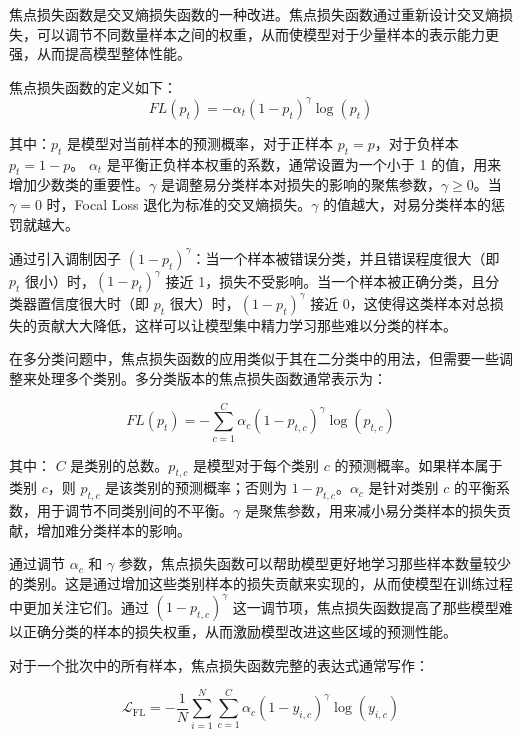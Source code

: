 焦点损失函数是交叉熵损失函数的一种改进。焦点损失函数通过重新设计交叉熵损失，可以调节不同数量样本之间的权重，从而使模型对于少量样本的表示能力更强，从而提高模型整体性能。


焦点损失函数的定义如下：
\begin{equation}
    FL(p_t) = -\alpha_t (1 - p_t)^\gamma \log(p_t)
\end{equation}

其中：\( p_t \) 是模型对当前样本的预测概率，对于正样本 \( p_t = p \)，对于负样本 \( p_t = 1 - p \)。 \( \alpha_t \) 是平衡正负样本权重的系数，通常设置为一个小于 1 的值，用来增加少数类的重要性。\( \gamma \) 是调整易分类样本对损失的影响的聚焦参数，\( \gamma \geq 0 \)。当 \( \gamma = 0 \) 时，Focal Loss 退化为标准的交叉熵损失。\( \gamma \) 的值越大，对易分类样本的惩罚就越大。


通过引入调制因子 \( (1 - p_t)^\gamma \)：当一个样本被错误分类，并且错误程度很大（即 \( p_t \) 很小）时，\( (1 - p_t)^\gamma \) 接近 1，损失不受影响。当一个样本被正确分类，且分类器置信度很大时（即 \( p_t \) 很大）时，\( (1 - p_t)^\gamma \) 接近 0，这使得这类样本对总损失的贡献大大降低，这样可以让模型集中精力学习那些难以分类的样本。


在多分类问题中，焦点损失函数的应用类似于其在二分类中的用法，但需要一些调整来处理多个类别。多分类版本的焦点损失函数通常表示为：

\begin{equation}
    FL(p_t) = - \sum_{c=1}^C \alpha_c (1 - p_{t,c})^\gamma \log(p_{t,c})
\end{equation}


其中：
\( C \) 是类别的总数。\( p_{t,c} \) 是模型对于每个类别 \( c \) 的预测概率。如果样本属于类别 \( c \)，则 \( p_{t,c} \) 是该类别的预测概率；否则为 \( 1 - p_{t,c} \)。\( \alpha_c \) 是针对类别 \( c \) 的平衡系数，用于调节不同类别间的不平衡。\( \gamma \) 是聚焦参数，用来减小易分类样本的损失贡献，增加难分类样本的影响。


通过调节 \( \alpha_c \) 和 \( \gamma \) 参数，焦点损失函数可以帮助模型更好地学习那些样本数量较少的类别。这是通过增加这些类别样本的损失贡献来实现的，从而使模型在训练过程中更加关注它们。通过 \( (1 - p_{t,c})^\gamma \) 这一调节项，焦点损失函数提高了那些模型难以正确分类的样本的损失权重，从而激励模型改进这些区域的预测性能。


对于一个批次中的所有样本，焦点损失函数完整的表达式通常写作：

\begin{equation}
    \mathcal{L}_{\text {FL}} = -\frac{1}{N} \sum_{i=1}^{N}\sum_{c=1}^C \alpha_c (1 - y_{i,c})^\gamma \log(y_{i,c})
\end{equation}


